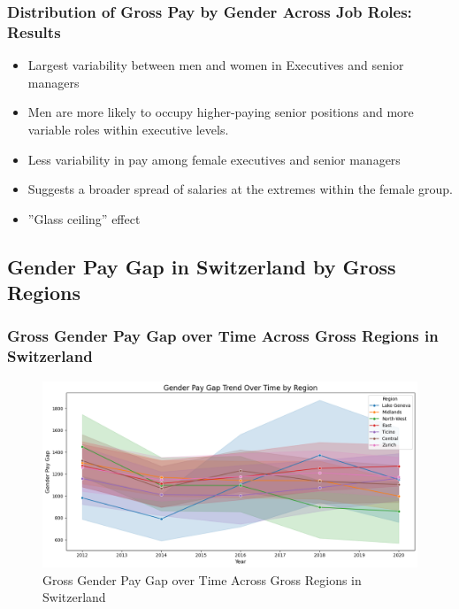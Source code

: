 \documentclass{beamer}
\begin{document}
\begin{frame}
\frametitle{Distribution of Gross Pay by Gender Across Job Roles: Results}
\begin{center}
  \begin{itemize}
    \item Largest variability between men and women in Executives and senior managers
    \item Men are more likely to occupy higher-paying senior positions and more variable roles
within executive levels.
    \item Less variability in pay among female executives and senior managers
    \item Suggests a broader spread of salaries at the extremes within the female group.
    \item  ”Glass ceiling” effect
\end{itemize} 
\end{center}
\end{frame}


\subsection{Gender Pay Gap in Switzerland by Gross Regions}

\begin{frame}
\frametitle{Gross Gender Pay Gap over Time Across Gross Regions in Switzerland}
\begin{center}
\begin{figure}[H]
    \includegraphics[width=\textwidth]{Figures/Pay_Gap_Over_Time_Region.png}
    \caption{Gross Gender Pay Gap over Time Across Gross Regions in Switzerland}
    \label{fig:trend_regions}
\end{figure}
\end{center}
\end{frame}
\end{document}
